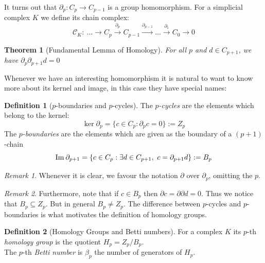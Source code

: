 \documentclass{article}
\newcommand{\img}{\textmd{Im}\:}
\theoremstyle{plain}
\newtheorem{thm}{Theorem}[section]
\theoremstyle{definition}
\newtheorem{definition}{Definition}[section]
\theoremstyle{remark}
\newtheorem{remark}{Remark}[section]
\begin{document}
It turns out that $ \partial_p : C_p \to C_{p-1} $ is a group homomorphism. For a simplicial complex $K$ we define its chain complex:
\[\mathcal{C}_K: \ \dots \longrightarrow C_p \stackrel{\partial_p}{\longrightarrow} C_{p-1} \stackrel{\partial_{p-1}}{\longrightarrow} \dots \stackrel{\partial_1}{\longrightarrow} C_0 \longrightarrow 0 \]

\begin{thm}[Fundamental Lemma of Homology]
	For all $p$ and $d \in C_{p+1}$, we have $ \partial_{p} \partial_{p+1} d = 0$
\end{thm}

Whenever we have an interesting homomorphism it is natural to want to know more about its kernel and image, in this case they have special names:

\begin{definition}[$p$-boundaries and $p$-cycles]
	The \emph{$p$-cycles} are the elements which belong to the kernel: \[ \ker\partial_{p} = \{ c \in C_p : \partial_p c = 0 \} := Z_p \]
	The \emph{$p$-boundaries} are the elements which are given as the boundary of a $(p+1)$-chain \[ \img\partial_{p+1} = \{ c \in C_p : \exists d \in C_{p+1} , \ c=\partial_{p+1} d \} := B_p \]
\end{definition}

\begin{remark}
Whenever it is clear, we favour the notation $\partial$ over $\partial_p$, omitting the $p$. 
\end{remark}
\begin{remark}
Furthermore, note that if $ c \in B_p $ then $ \partial c = \partial \partial d = 0 $. Thus we notice that $ B_p \subseteq Z_p $. But in general $ B_p \neq Z_p $. %
The difference between $p$-cycles and $p$-boundaries is what motivates the definition of homology groups.
\end{remark}

\begin{definition}[Homology Groups and Betti numbers]
	For a complex $K$ its $p$-th \emph{homology group} is the quotient $H_p = Z_p/B_p $.\\
	The $p$-th \emph{Betti number} is $ \beta_p $ the number of generators of $H_p$.
\end{definition} 
\end{document}
